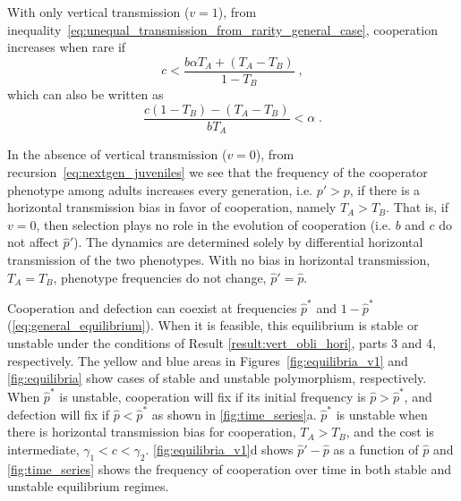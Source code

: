 \documentclass[12pt]{extarticle}
\begin{document}
With only vertical transmission ($v=1$), from inequality~\ref{eq:unequal_transmission_from_rarity_general_case}, cooperation increases when rare if
\begin{equation} \label{eq:vert_hori}
c < \frac{b \alpha T_A + (T_A - T_B)}{1-T_B} \;,
\end{equation} 
which can also be written as
\begin{equation} \label{eq:vert_hori_alpha}
\frac{c (1-T_B)-(T_A-T_B)}{b T_A} < \alpha \;.
\end{equation}

In the absence of vertical transmission ($v=0$), from recursion~\ref{eq:nextgen_juveniles} we see that the frequency of the cooperator phenotype among adults increases every generation, i.e. $p'>p$, if there is a horizontal transmission bias in favor of cooperation, namely $T_A > T_B$.  
That is, if $v=0$, then selection plays no role in the evolution of cooperation (i.e. $b$ and $c$ do not affect $\hat p'$).
The dynamics are determined solely by differential horizontal transmission of the two phenotypes.
With no bias in horizontal transmission, $T_A = T_B$, phenotype frequencies do not change, $\hat p'=\hat p$.

Cooperation and defection can coexist at frequencies $\hat{p}^*$ and $1-\hat{p}^*$ (\autoref{eq:general_equilibrium}). 
When it is feasible, this equilibrium is stable or unstable under the conditions of Result \ref{result:vert_obli_hori}, parts 3 and 4, respectively. The yellow and blue areas in Figures~\ref{fig:equilibria_v1} and \ref{fig:equilibria} show cases of stable and unstable polymorphism, respectively.
When $\hat{p}^*$ is unstable, cooperation will fix if its initial frequency is $\hat{p}>\hat{p}^*$, and defection will fix if $\hat{p}<\hat{p}^*$ as shown in \autoref{fig:time_series}a.
$\hat{p}^*$ is unstable when there is horizontal transmission bias for cooperation, $T_A>T_B$, and the cost is intermediate, $\gamma_1 < c < \gamma_2$.
\autoref{fig:equilibria_v1}d shows $\hat{p}'-\hat{p}$ as a function of $\hat{p}$ and \autoref{fig:time_series} shows the frequency of cooperation over time in both stable and unstable equilibrium regimes.
\end{document}
